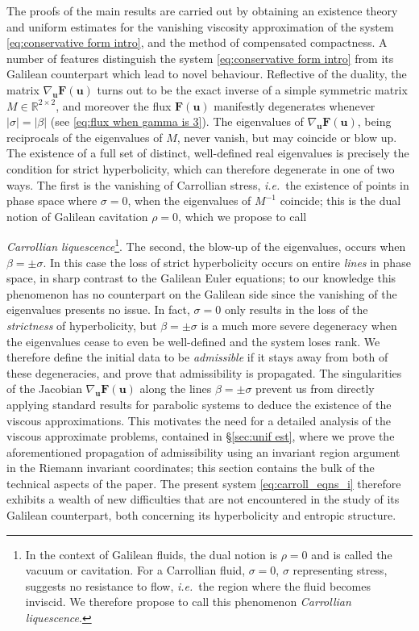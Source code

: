 \documentclass[11pt,a4paper,reqno]{amsart}
\numberwithin{equation}{section}
\theoremstyle{definition}
\theoremstyle{remark}
\newcommand{\bu}{\mathbf{u}}
\newcommand{\bF}{\mathbf{F}}
\begin{document}
The proofs of the main results are carried out by obtaining an existence theory and uniform estimates for the vanishing viscosity approximation of the system \eqref{eq:conservative form intro}, and the method of compensated compactness. A number of features distinguish the system \eqref{eq:conservative form intro} from its Galilean counterpart which lead to novel behaviour. Reflective of the duality, the matrix $\nabla_{\bu} \bF(\bu)$ turns out to be the exact inverse of a simple symmetric matrix $M \in \mathbb{R}^{2\times 2}$, and moreover the flux $\bF(\bu)$ manifestly degenerates whenever $|\sigma| = |\beta|$ (see \eqref{eq:flux when gamma is 3}). The eigenvalues of $\nabla_\bu \bF(\bu)$, being reciprocals of the eigenvalues of $M$, never vanish, but may coincide or blow up. The existence of a full set of distinct, well-defined real eigenvalues is precisely the condition for strict hyperbolicity, which can therefore degenerate in one of two ways. The first is the vanishing of Carrollian stress, \emph{i.e.}~the existence of points in phase space where $\sigma = 0$, when the eigenvalues of $M^{-1}$ coincide; this is the dual notion of Galilean cavitation $\rho = 0$, which we propose to call {\emph{Carrollian liquescence}\footnote{In the context of Galilean fluids, the dual notion is $\rho=0$ and is called the vacuum or cavitation. For a Carrollian fluid, $\sigma=0$, $\sigma$ representing stress, suggests no resistance to flow, \emph{i.e.}~the region where the fluid becomes inviscid. We therefore propose to call this phenomenon \emph{Carrollian liquescence}.}. The second, the blow-up of the eigenvalues, occurs when $\beta = \pm \sigma$. In this case the loss of strict hyperbolicity occurs on entire \emph{lines} in phase space, in sharp contrast to the Galilean Euler equations; to our knowledge this phenomenon has no counterpart on the Galilean side since the vanishing of the eigenvalues presents no issue. In fact, $\sigma = 0$ only results in the loss of the \emph{strictness} of hyperbolicity, but $\beta = \pm \sigma$ is a much more severe degeneracy when the eigenvalues cease to even be well-defined and the system loses rank. We therefore define the initial data to be \emph{admissible} if it stays away from both of these degeneracies, and prove that admissibility is propagated. The singularities of the Jacobian $\nabla_\bu \bF(\bu)$ along the lines $\beta = \pm \sigma$ prevent us from directly applying standard results for parabolic systems to deduce the existence of the viscous approximations. This motivates the need for a detailed analysis of the viscous approximate problems, contained in \S \ref{sec:unif est}, where we prove the aforementioned propagation of admissibility using an invariant region argument in the Riemann invariant coordinates; this section contains the bulk of the technical aspects of the paper. The present system \eqref{eq:carroll_eqns_i} therefore exhibits a wealth of new difficulties that are not encountered in the study of its Galilean counterpart, both concerning its hyperbolicity and entropic structure.

}
\end{document}
